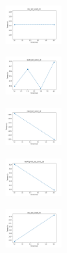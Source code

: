 \vspace*{\fill}

\newpage

\vspace*{\fill}

\begin{figure}[H]    
    \centering
    \begin{subfigure}
        \centering
        \includegraphics[width=0.234\textwidth]{img/copkm/iris_set_const_20_949004259_time.png}
    \end{subfigure}
    \hfill
    \begin{subfigure}
        \centering
        \includegraphics[width=0.234\textwidth]{img/copkm/ecoli_set_const_20_949004259_time.png}
    \end{subfigure}
    \hfill
    \begin{subfigure}
        \centering
        \includegraphics[width=0.234\textwidth]{img/copkm/rand_set_const_20_949004259_time.png}
    \end{subfigure}
    \hfill
    \begin{subfigure}
        \centering
        \includegraphics[width=0.234\textwidth]{img/copkm/newthyroid_set_const_20_949004259_time.png}
    \end{subfigure}
    \hfill
    \begin{subfigure}
        \centering
        \includegraphics[width=0.234\textwidth]{img/copkm/iris_set_const_20_589741062_time.png}

\end{subfigure}
\end{figure}
